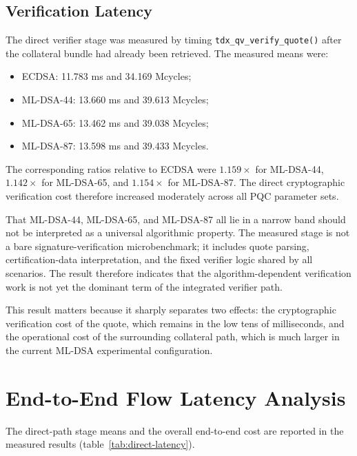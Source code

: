 \subsection{Verification Latency}

The direct verifier stage was measured by timing
\texttt{tdx\_qv\_verify\_quote()} after the collateral bundle had already been
retrieved. The measured means were:

\begin{itemize}
  \item ECDSA: 11.783 ms and 34.169 Mcycles;
  \item ML-DSA-44: 13.660 ms and 39.613 Mcycles;
  \item ML-DSA-65: 13.462 ms and 39.038 Mcycles;
  \item ML-DSA-87: 13.598 ms and 39.433 Mcycles.
\end{itemize}

The corresponding ratios relative to ECDSA were \(1.159\times\) for
ML-DSA-44, \(1.142\times\) for ML-DSA-65, and \(1.154\times\) for
ML-DSA-87. The direct cryptographic verification cost therefore increased
moderately across all PQC parameter sets.

That ML-DSA-44, ML-DSA-65, and ML-DSA-87 all lie in a narrow band should not
be interpreted as a universal algorithmic property. The measured stage is not
a bare signature-verification microbenchmark; it includes quote parsing,
certification-data interpretation, and the fixed verifier logic shared by all
scenarios. The result therefore indicates that the algorithm-dependent
verification work is not yet the dominant term of the integrated verifier
path.

This result matters because it sharply separates two effects: the
cryptographic verification cost of the quote, which remains in the low tens of
milliseconds, and the operational cost of the surrounding collateral path,
which is much larger in the current ML-DSA experimental configuration.

\section{End-to-End Flow Latency Analysis}

The direct-path stage means and the overall end-to-end cost are reported in
the measured results (table~\ref{tab:direct-latency}).

